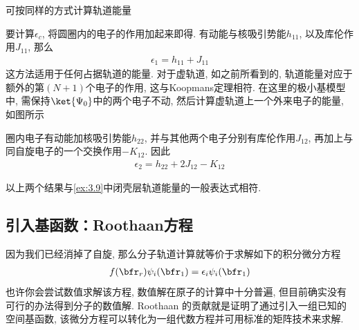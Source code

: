 可按同样的方式计算轨道能量
\begin{figure}[H]\centering
\end{figure}
要计算$\epsilon_c$, 
将圆圈内的电子的作用加起来即得. 
有动能与核吸引势能$h_{11}$,
以及库伦作用$J_{11}$, 
那么
\begin{align}
	\epsilon_1 = h_{11} + J_{11}
\end{align}
这方法适用于任何占据轨道的能量. 
对于虚轨道, 
如之前所看到的, 
轨道能量对应于额外的第$(N+1)$个电子的作用, 
这与Koopmans定理相符. 
在这里的极小基模型中, 
需保持$\ket{\Psi_0}$中的两个电子不动, 
然后计算虚轨道上一个外来电子的能量, 
如图所示
\begin{figure}[H]\centering
\end{figure}
圈内电子有动能加核吸引势能$h_{22}$, 
并与其他两个电子分别有库伦作用$J_{12}$, 
再加上与同自旋电子的一个交换作用$-K_{12}$. 
因此
\begin{align}
	\epsilon_2 = h_{22} + 2J_{12} - K_{12}
\end{align}

以上两个结果与\autoref{ex:3.9}中闭壳层轨道能量的一般表达式相符.

\subsection{引入基函数：Roothaan方程}
因为我们已经消掉了自旋, 
那么分子轨道计算就等价于求解如下的积分微分方程
\begin{align}
	\label{3.132}
	f(\bfr_r)\psi_i(\bfr_1) = \epsilon_i\psi_i(\bfr_1)
\end{align}
也许你会尝试数值求解该方程, 数值解在原子的计算中十分普遍, 但目前确实没有可行的办法得到分子的数值解. 
Roothaan
的贡献就是证明了通过引入一组已知的空间基函数, 该微分方程可以转化为一组代数方程并可用标准的矩阵技术来求解.


